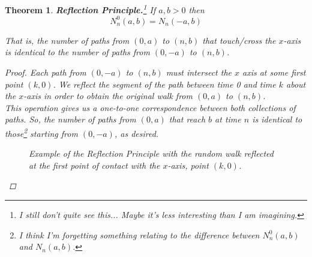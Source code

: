 \documentclass[12pt]{article}
\newtheorem{theorem}{Theorem}
\newlength\tindent
\renewcommand{\indent}{\hspace*{\tindent}}
\begin{document}
\begin{theorem} {\bf Reflection Principle.}\footnote{I still don't quite see this... Maybe it's less interesting than I am imagining.} If $a, b > 0$ then
\begin{equation*}
	N^0_n(a, b) = N_n(-a,b)
\end{equation*}

\indent That is, the number of paths from $(0,a)$ to $(n,b)$ that touch/cross the $x$-axis is identical to the number of paths from $(0,-a)$ to $(n,b)$.

\begin{proof} Each path from $(0, -a)$ to $(n,b)$ must intersect the $x$ axis at some first point $(k,0)$. We reflect the segment of the path between time 0 and time $k$ about the $x$-axis in order to obtain the original walk from $(0,a)$ to $(n, b)$. \\

\indent This operation gives us a one-to-one correspondence between both collections of paths. So, the number of paths from $(0, a)$ that reach $b$ at time $n$ is identical to those\footnote{I think I'm forgetting something relating to the difference between $N^0_n(a,b)$ and $N_n(a,b)$.} starting from $(0, -a)$, as desired.

\begin{figure}[H]
\centering
{}
\caption{Example of the Reflection Principle with the random walk reflected at the first point of contact with the $x$-axis, point $(k,0)$.}
\end{figure}
\end{proof}
\end{theorem}
\end{document}
